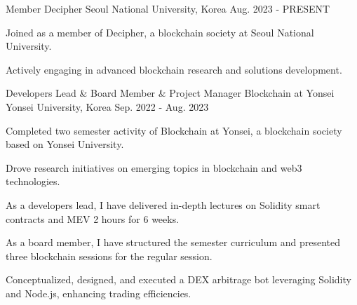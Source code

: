 


\begin{cventries}


\cventry
{Member} %
{Decipher} %
{Seoul National University, Korea} %
{Aug. 2023 - PRESENT} %
{ %
\begin{cvitems}
\item {Joined as a member of Decipher, a blockchain society at Seoul National University.}
\item {Actively engaging in advanced blockchain research and solutions development.}
\end{cvitems}
}


\cventry
{Developers Lead \& Board Member \& Project Manager} %
{Blockchain at Yonsei} %
{Yonsei University, Korea} %
{Sep. 2022 - Aug. 2023} %
{ %
\begin{cvitems}
\item {Completed two semester activity of Blockchain at Yonsei, a blockchain society based on Yonsei University.}
\item {Drove research initiatives on emerging topics in blockchain and web3 technologies.}
\item {As a developers lead, I have delivered in-depth lectures on Solidity smart contracts and MEV 2 hours for 6 weeks.}
\item {As a board member, I have structured the semester curriculum and presented three blockchain sessions for the regular session.}
\item {Conceptualized, designed, and executed a DEX arbitrage bot leveraging Solidity and Node.js, enhancing trading efficiencies.}
\end{cvitems}
}


\end{cventries}
